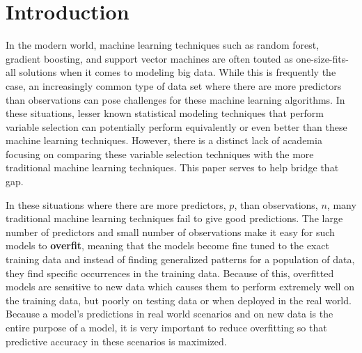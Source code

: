 \documentclass{article}
\begin{document}
\section{Introduction}

In the modern world, machine learning techniques such as random forest, gradient boosting, and support vector machines are often touted as one-size-fits-all solutions when it comes to modeling big data. While this is frequently the case, an increasingly common type of data set where there are more predictors than observations can pose challenges for these machine learning algorithms. In these situations, lesser known statistical modeling techniques that perform variable selection can potentially perform equivalently or even better than these machine learning techniques. However, there is a distinct lack of academia focusing on comparing these variable selection techniques with the more traditional machine learning techniques. This paper serves to help bridge that gap.



In these situations where there are more predictors, $p$, than observations, $n$, many traditional machine learning techniques fail to give good predictions. The large number of predictors and small number of observations make it easy for such models to \textbf{overfit}, meaning that the models become fine tuned to the exact training data and instead of finding generalized patterns for a population of data, they find specific occurrences in the training data. Because of this, overfitted models are sensitive to new data which causes them to perform extremely well on the training data, but poorly on testing data or when deployed in the real world. Because a model's predictions in real world scenarios and on new data is the entire purpose of a model, it is very important to reduce overfitting so that predictive accuracy in these scenarios is maximized.
\end{document}
